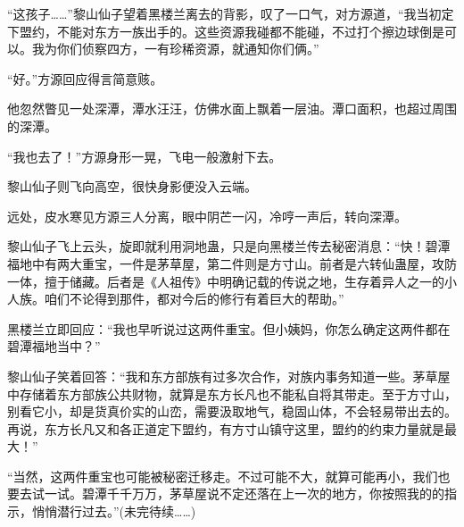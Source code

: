\begin{this_body}
“这孩子……”黎山仙子望着黑楼兰离去的背影，叹了一口气，对方源道，“我当初定下盟约，不能对东方一族出手的。这些资源我碰都不能碰，不过打个擦边球倒是可以。我为你们侦察四方，一有珍稀资源，就通知你们俩。”

“好。”方源回应得言简意赅。

他忽然瞥见一处深潭，潭水汪汪，仿佛水面上飘着一层油。潭口面积，也超过周围的深潭。

“我也去了！”方源身形一晃，飞电一般激射下去。

黎山仙子则飞向高空，很快身影便没入云端。

远处，皮水寒见方源三人分离，眼中阴芒一闪，冷哼一声后，转向深潭。

黎山仙子飞上云头，旋即就利用洞地蛊，只是向黑楼兰传去秘密消息：“快！碧潭福地中有两大重宝，一件是茅草屋，第二件则是方寸山。前者是六转仙蛊屋，攻防一体，擅于储藏。后者是《人祖传》中明确记载的传说之地，生存着异人之一的小人族。咱们不论得到那件，都对今后的修行有着巨大的帮助。”

黑楼兰立即回应：“我也早听说过这两件重宝。但小姨妈，你怎么确定这两件都在碧潭福地当中？”

黎山仙子笑着回答：“我和东方部族有过多次合作，对族内事务知道一些。茅草屋中存储着东方部族公共财物，就算是东方长凡也不能私自将其带走。至于方寸山，别看它小，却是货真价实的山峦，需要汲取地气，稳固山体，不会轻易带出去的。再说，东方长凡又和各正道定下盟约，有方寸山镇守这里，盟约的约束力量就是最大！”

“当然，这两件重宝也可能被秘密迁移走。不过可能不大，就算可能再小，我们也要去试一试。碧潭千千万万，茅草屋说不定还落在上一次的地方，你按照我的的指示，悄悄潜行过去。”(未完待续……)

\end{this_body}

